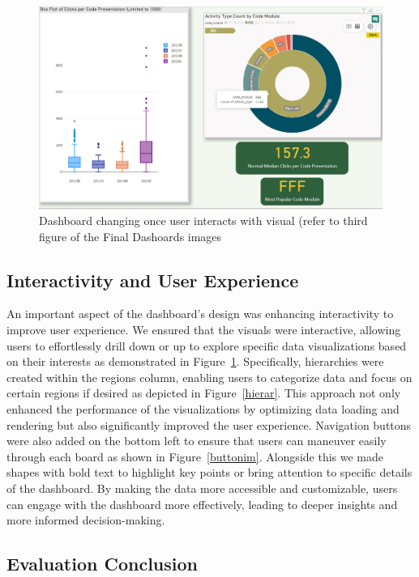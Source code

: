 \begin{figure}[h]
    \centering
    \includegraphics[width=\linewidth]{photo/changing.png}
    \caption{Dashboard changing once user interacts with visual (refer to third figure of the Final Dashoards images}
    \label{changin}
\end{figure}


\subsection*{Interactivity and User Experience}

An important aspect of the dashboard's design was enhancing interactivity to improve user experience. We ensured that the visuals were interactive, allowing users to effortlessly drill down or up to explore specific data visualizations based on their interests as demonstrated in Figure~\ref{changin}. Specifically, hierarchies were created within the regions column, enabling users to categorize data and focus on certain regions if desired as depicted in Figure~\ref{hierar}. This approach not only enhanced the performance of the visualizations by optimizing data loading and rendering but also significantly improved the user experience. Navigation buttons were also added on the bottom left to ensure that users can maneuver easily through each board as shown in Figure~\ref{buttonim}. Alongside this we made shapes with bold text to highlight key points or bring attention to specific details of the dashboard. By making the data more accessible and customizable, users can engage with the dashboard more effectively, leading to deeper insights and more informed decision-making.


\subsection*{Evaluation Conclusion}

